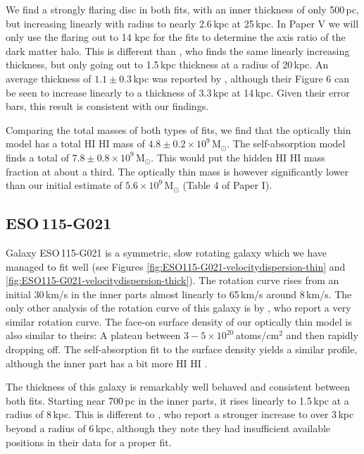 \documentclass[useAMS,usenatbib]{mn2e}
\newcommand{\hi}{%
  \relax
  \ifmmode
    \textrm{\textsc{HI}}
  \else
    \textsc{H{\smaller}I}
  \fi
}
\begin{document}
We find a strongly flaring disc in both fits, with an inner 
thickness of only 500\,pc, but increasing linearly with radius 
to nearly 2.6\,kpc at 25\,kpc. In Paper V we will only use the flaring 
out to 14 kpc for the fits to determine the axis ratio of the dark matter 
halo.
This is different than \citet{OBrien2010C}, who finds the same 
linearly increasing thickness, but only going out to 1.5\,kpc 
thickness at a radius of 20\,kpc.
An average thickness of $1.1\pm0.3$\,kpc was reported by 
\citet{vanderKruit2001A}, although their Figure 6 can be 
seen to increase linearly to a thickness of 3.3\,kpc at 14\,kpc. 
Given their error bars, this result is consistent with our findings.

Comparing the total masses of both types of fits, we find 
that the optically thin model has a total \hi mass of 
$4.8\pm0.2\times10^9$\,M$_\odot$.
The self-absorption model finds a total of $7.8\pm0.8\times10^9$\,M$_\odot$.
This would put the hidden \hi mass fraction at about a third.
The optically thin mass is however significantly lower than our 
initial estimate of $5.6 \times 10^{9}$\,M$_\odot$ 
(Table 4 of Paper I). 

\subsection{ESO\,115-G021}
Galaxy ESO\,115-G021 is a symmetric, slow rotating 
galaxy which we have managed to fit well (see Figures 
\ref{fig:ESO115-G021-velocitydispersion-thin} 
and \ref{fig:ESO115-G021-velocitydispersion-thick}).
The rotation curve rises from an initial 30\,km/s 
in the inner parts almost linearly to 65\,km/s around 8\,km/s.
The only other analysis of the rotation curve of 
this galaxy is by \citet{OBrien2010C}, who report a very similar rotation curve.
The face-on surface density of our optically thin 
model is also similar to theirs: A plateau between 
$3-5\times10^{20}$\,atoms/cm$^2$ and then rapidly dropping off.
The self-absorption fit to the surface density yields 
a similar profile, although the inner part has a bit more \hi.

The thickness of this galaxy is remarkably well behaved 
and consistent between both fits.
Starting  near 700\,pc in the inner parts, it rises 
linearly to 1.5\,kpc at a radius of 8\,kpc.
This is different to \citet{OBrien2010C}, who report 
a stronger increase  to over 3\,kpc beyond a radius 
of 6\,kpc, although they note they had insufficient available 
positions in their data for a proper fit.
\end{document}
